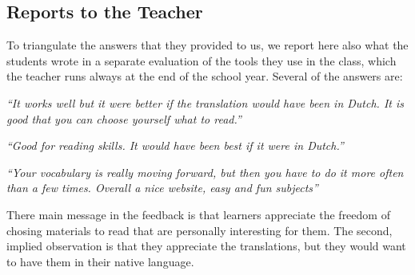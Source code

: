 \newpage
\subsection{Reports to the Teacher}
To triangulate the answers that they provided to us, we report here also what the students wrote in a separate evaluation of the tools they use in the class, which the teacher runs always at the end of the school year. Several of the answers are: 

\begin{description}
  \item {\em ``It works well but it were better if the translation would have been in Dutch. It is good that you can choose yourself what to read.''}
  \item {\em ``Good for reading skills. It would have been best if it were in Dutch.''}
  \item {\em ``Your vocabulary is really moving forward, but then you have to do it more often than a few times. Overall a nice website, easy and fun subjects''}
\end{description}

There main message in the feedback is that learners appreciate the freedom of chosing materials to read that are personally interesting for them. The second, implied observation is that they appreciate the translations, but they would want to have them in their native language. 



